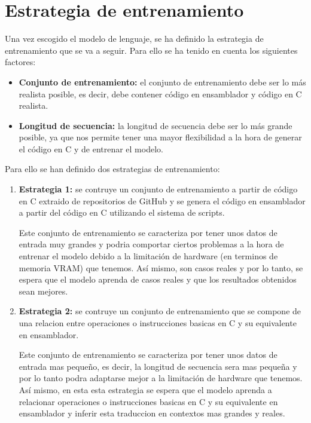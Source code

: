 \section{Estrategia de entrenamiento}
\label{sec:estrategia_entrenamiento}

Una vez escogido el modelo de lenguaje, se ha definido la estrategia de entrenamiento
que se va a seguir. Para ello se ha tenido en cuenta los siguientes factores:

\begin{itemize}
    \item \textbf{Conjunto de entrenamiento:} el conjunto de entrenamiento debe ser
        lo más realista posible, es decir, debe contener código en ensamblador y código
        en C realista.
    \item \textbf{Longitud de secuencia:} la longitud de secuencia debe ser lo más
        grande posible, ya que nos permite tener una mayor flexibilidad a la hora de
        generar el código en C y de entrenar el modelo.
\end{itemize}

Para ello se han definido dos estrategias de entrenamiento:

\begin{enumerate}
    \item \textbf{Estrategia 1:} se contruye un conjunto de entrenamiento a partir
        de código en C extraido de repositorios de GitHub y se genera el código en
        ensamblador a partir del código en C utilizando el sistema de scripts.

        Este conjunto de entrenamiento se caracteriza por tener unos datos de entrada
        muy grandes y podria comportar ciertos problemas a la hora de entrenar el modelo
        debido a la limitación de hardware (en terminos de memoria VRAM) que tenemos. Así
        mismo, son casos reales y por lo tanto, se espera que el modelo aprenda de casos
        reales y que los resultados obtenidos sean mejores.
        
    \item \textbf{Estrategia 2:} se contruye un conjunto de entrenamiento que se compone 
        de una relacion entre operaciones o instrucciones basicas en C y su equivalente
        en ensamblador. 

        Este conjunto de entrenamiento se caracteriza por tener unos datos de entrada
        mas pequeño, es decir, la longitud de secuencia sera mas pequeña y por lo tanto
        podra adaptarse mejor a la limitación de hardware que tenemos. Así mismo, en esta
        esta estrategia se espera que el modelo aprenda a relacionar operaciones o instrucciones
        basicas en C y su equivalente en ensamblador y inferir esta traduccion en contextos mas
        grandes y reales.
\end{enumerate}









